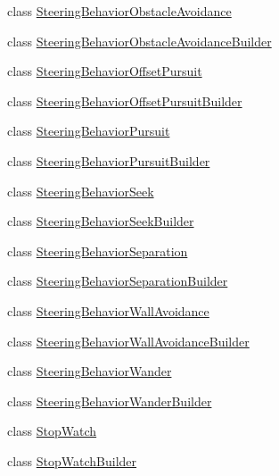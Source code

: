 \begin{DoxyCompactItemize}
\item 
class \mbox{\hyperlink{classnjli_1_1_world_factory_a1da7ab3cfd5a6711ca76774954b3a096}{Steering\+Behavior\+Obstacle\+Avoidance}}
\item 
class \mbox{\hyperlink{classnjli_1_1_world_factory_ad8731e644336210104f9631702ea93d0}{Steering\+Behavior\+Obstacle\+Avoidance\+Builder}}
\item 
class \mbox{\hyperlink{classnjli_1_1_world_factory_a54892f2ace29aabcbb239f16f6d729d0}{Steering\+Behavior\+Offset\+Pursuit}}
\item 
class \mbox{\hyperlink{classnjli_1_1_world_factory_a7d246dd92c1f696f053c52a5b28d6523}{Steering\+Behavior\+Offset\+Pursuit\+Builder}}
\item 
class \mbox{\hyperlink{classnjli_1_1_world_factory_a75514aa5f0adbcd2fae7b6b32e750f77}{Steering\+Behavior\+Pursuit}}
\item 
class \mbox{\hyperlink{classnjli_1_1_world_factory_ae2adf47370adb0997eccd93936d58e38}{Steering\+Behavior\+Pursuit\+Builder}}
\item 
class \mbox{\hyperlink{classnjli_1_1_world_factory_aa2cc41a75c2f9745d0b127905dae2fc3}{Steering\+Behavior\+Seek}}
\item 
class \mbox{\hyperlink{classnjli_1_1_world_factory_a9243219c83467ad2e6db865d4348b292}{Steering\+Behavior\+Seek\+Builder}}
\item 
class \mbox{\hyperlink{classnjli_1_1_world_factory_a60b1336339ae5d4c34ff42a23552dfe5}{Steering\+Behavior\+Separation}}
\item 
class \mbox{\hyperlink{classnjli_1_1_world_factory_ab698696e5d1087b1b4e0af8c48997c27}{Steering\+Behavior\+Separation\+Builder}}
\item 
class \mbox{\hyperlink{classnjli_1_1_world_factory_aa4041a2cd5bedbbe30352a5659dff090}{Steering\+Behavior\+Wall\+Avoidance}}
\item 
class \mbox{\hyperlink{classnjli_1_1_world_factory_aad2b8165e983170b96433d4ec36ec52e}{Steering\+Behavior\+Wall\+Avoidance\+Builder}}
\item 
class \mbox{\hyperlink{classnjli_1_1_world_factory_a605d290e322fcfa680bf59e1e43f802b}{Steering\+Behavior\+Wander}}
\item 
class \mbox{\hyperlink{classnjli_1_1_world_factory_a5276bdd24efda2c3b2f5f807766cd833}{Steering\+Behavior\+Wander\+Builder}}
\item 
class \mbox{\hyperlink{classnjli_1_1_world_factory_a9cfe516a7abece038bff141a1bbe49f4}{Stop\+Watch}}
\item 
class \mbox{\hyperlink{classnjli_1_1_world_factory_a0c05537ccc765fccea6bc44fdd1c27fc}{Stop\+Watch\+Builder}}

\end{DoxyCompactItemize}
